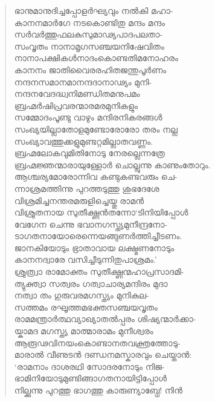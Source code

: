 \begin{verse}
ഭാനുമാനുദിച്ചപ്പോളര്‍ഘ്യവും നല്‍കി മഹാ-\\
കാനനമാര്‍ഗേ നടകൊണ്ടിതു മന്ദം മന്ദം\\
സര്‍വര്‍ത്തുഫലകുസുമാഢ്യപാദപലതാ-\\
സംവൃതം നാനാമൃഗസഞ്ചയനിഷേവിതം\\
നാനാപക്ഷികള്‍നാദംകൊണ്ടതിമനോഹരം\\
കാനനം ജാതിവൈരരഹിതജന്തുപൂര്‍ണം\\
നന്ദനസമാനമാനന്ദദാനാഢ്യം മുനി-\\
നന്ദനവേദദ്ധ്വനിമണ്ഡിതമനുപമം\\
ബ്രഹ്മര്‍ഷിപ്രവരന്മാരമരമുനികളും\\
സമ്മോദംപൂണ്ടു വാഴും മന്ദിരനികരങ്ങള്‍\\
സംഖ്യയില്ലാതോളമുണ്ടോരോരോ തരം നല്ല\\
സംഖ്യാവത്തുക്കളുമുണ്ടറ്റമില്ലാതവണ്ണം.\\
ബ്രഹ്മലോകവുമിതിനോടു നേരല്ലെന്നത്രേ\\
ബ്രഹ്മജ്ഞന്മാരായുള്ളോര്‍ ചൊല്ലുന്നു കാണുംതോറും.\\
ആശ്ചര്യമോരോന്നിവ കണ്ടുകണ്ടവരും ചെ-\\
ന്നാശ്രമത്തിന്നു പുറത്തടുത്തു ശുഭദേശേ\\
വിശ്രമിച്ചനന്തരമരുളിച്ചെയ്തു രാമന്‍\\
വിശ്രുതനായ സുതീക്ഷ്ണന്‍തന്നോ‘ടിനിയിപ്പോള്‍\\
വേഗേന ചെന്നു ഭവാനഗസ്ത്യമുനീന്ദ്രനോ-\\
ടാഗതനായോരെന്നെയങ്ങുണര്‍ത്തിച്ചീടണം.\\
ജാനകിയോടും ഭ്രാതാവായ ലക്ഷ്മണനോടും\\
കാനനദ്വാരേ വസിച്ചീടുന്നിതുപാശ്രമം.’\\
ശ്രുത്ര്വാ രാമോക്തം സുതീക്ഷ്ണന്മഹാപ്രസാദമി-\\
ത്യുക്ത്വാ സത്വരം ഗത്വാചാര്യമന്ദിരം മുദാ\\
നത്വാ തം ഗുരുവരമഗസ്ത്യം മുനികുല-\\
സത്തമം രഘൂത്തമഭക്തസഞ്ചയവൃതം\\
രാമമന്ത്രാര്‍ത്ഥവ്യാഖ്യാതല്‍പ്പരം ശിഷ്യന്മാര്‍ക്കാ-\\
യ്കാമദ മഗസ്ത്യ മാത്മാരാമം മുനീശ്വരം\\
ആരൂഢവിനയംകൊണ്ടാനതവക്ത്രത്തോടു-\\
മാരാല്‍ വീണുടന്‍ ദണ്ഡനമസ്കാരവും ചെയ്താന്‍:\\
‘രാമനാം ദാശരഥി സോദരനോടും നിജ-\\
ഭാമിനിയോടുമുണ്ടിങ്ങാഗതനായിട്ടിപ്പോള്‍\\
നില്ക്കുന്നു പുറത്തു ഭാഗത്തു കാരുണ്യാബ്ധേ! നിന്‍\\

\end{verse}
